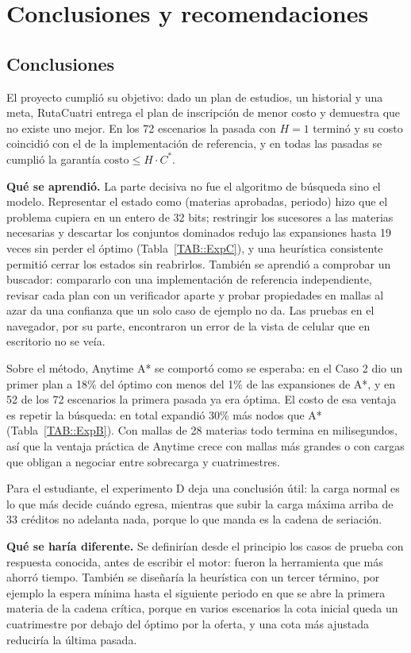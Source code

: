 \chapter{Conclusiones y recomendaciones}

\section{Conclusiones}
El proyecto cumplió su objetivo: dado un plan de estudios, un historial y una meta, RutaCuatri entrega el plan de inscripción de menor costo y demuestra que no existe uno mejor. En los 72 escenarios la pasada con $H = 1$ terminó y su costo coincidió con el de la implementación de referencia, y en todas las pasadas se cumplió la garantía $\text{costo} \leq H \cdot C^*$.

\textbf{Qué se aprendió.} La parte decisiva no fue el algoritmo de búsqueda sino el modelo. Representar el estado como (materias aprobadas, periodo) hizo que el problema cupiera en un entero de 32 bits; restringir los sucesores a las materias necesarias y descartar los conjuntos dominados redujo las expansiones hasta 19 veces sin perder el óptimo (Tabla~\ref{TAB::ExpC}), y una heurística consistente permitió cerrar los estados sin reabrirlos. También se aprendió a comprobar un buscador: compararlo con una implementación de referencia independiente, revisar cada plan con un verificador aparte y probar propiedades en mallas al azar da una confianza que un solo caso de ejemplo no da. Las pruebas en el navegador, por su parte, encontraron un error de la vista de celular que en escritorio no se veía.

Sobre el método, Anytime A* se comportó como se esperaba: en el Caso 2 dio un primer plan a 18\% del óptimo con menos del 1\% de las expansiones de A*, y en 52 de los 72 escenarios la primera pasada ya era óptima. El costo de esa ventaja es repetir la búsqueda: en total expandió 30\% más nodos que A* (Tabla~\ref{TAB::ExpB}). Con mallas de 28 materias todo termina en milisegundos, así que la ventaja práctica de Anytime crece con mallas más grandes o con cargas que obligan a negociar entre sobrecarga y cuatrimestres.

Para el estudiante, el experimento D deja una conclusión útil: la carga normal es lo que más decide cuándo egresa, mientras que subir la carga máxima arriba de 33 créditos no adelanta nada, porque lo que manda es la cadena de seriación.

\textbf{Qué se haría diferente.} Se definirían desde el principio los casos de prueba con respuesta conocida, antes de escribir el motor: fueron la herramienta que más ahorró tiempo. También se diseñaría la heurística con un tercer término, por ejemplo la espera mínima hasta el siguiente periodo en que se abre la primera materia de la cadena crítica, porque en varios escenarios la cota inicial queda un cuatrimestre por debajo del óptimo por la oferta, y una cota más ajustada reduciría la última pasada.

